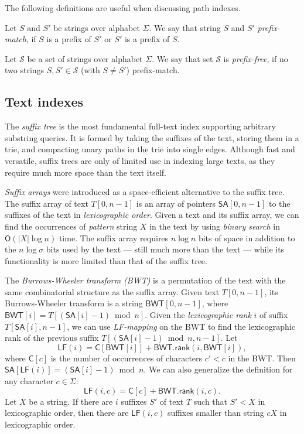 \documentclass[a4paper,UKenglish]{lipics-v2016}
\newcommand{\abs}[1]{\ensuremath{\lvert #1 \rvert}}
\newcommand{\Oh}[1]{\ensuremath{\mathsf{O}\!\left( #1 \right)}}
\newcommand{\rank}{\ensuremath{\mathsf{rank}}}
\newcommand{\LF}{\ensuremath{\mathsf{LF}}}
\newcommand{\LFmapping}{LF\nobreakdash-mapping}
\newcommand{\SA}{\ensuremath{\mathsf{SA}}}
\newcommand{\BWT}{\ensuremath{\mathsf{BWT}}}
\newcommand{\Carray}{\ensuremath{\mathsf{C}}}
\begin{document}
The following definitions are useful when discussing path indexes.

\begin{definition}
Let $S$ and $S'$ be strings over alphabet $\Sigma$. We say that string $S$ and $S'$ \emph{prefix-match}, if $S$ is a prefix of $S'$ or $S'$ is a prefix of $S$.
\end{definition}

\begin{definition}
Let $\mathcal{S}$ be a set of strings over alphabet $\Sigma$. We say that set $\mathcal{S}$ is \emph{prefix-free}, if no two strings $S, S' \in \mathcal{S}$ (with $S \ne S'$) prefix-match.
\end{definition}

\subsection{Text indexes}

The \emph{suffix tree} \cite{Weiner1973} is the most fundamental full-text index supporting arbitrary substring queries. It is formed by taking the suffixes of the text, storing them in a trie, and compacting unary paths in the trie into single edges. Although fast and versatile, suffix trees are only of limited use in indexing large texts, as they require much more space than the text itself.

\emph{Suffix arrays} \cite{Manber1993} were introduced as a space-efficient alternative to the suffix tree. The suffix array of text $T[0, n-1]$ is an array of pointers $\SA[0, n-1]$ to the suffixes of the text in \emph{lexicographic order}. Given a text and its suffix array, we can find the occurrences of \emph{pattern} string $X$ in the text by using \emph{binary search} in $\Oh{\abs{X} \log n}$ time. The suffix array requires $n \log n$ bits of space in addition to the $n \log \sigma$ bits used by the text --- still much more than the text --- while its functionality is more limited than that of the suffix tree.

The \emph{Burrows-Wheeler transform (BWT)} \cite{Burrows1994} is a permutation of the text with the same combinatorial structure as the suffix array. Given text $T[0, n-1]$, its Burrows-Wheeler transform is a string $\BWT[0, n-1]$, where $\BWT[i] = T[(\SA[i]-1) \bmod n]$. Given the \emph{lexicographic rank} $i$ of suffix $T[\SA[i], n-1]$, we can use \emph{\LFmapping} on the BWT to find the lexicographic rank of the previous suffix $T[(\SA[i]-1) \bmod n, n-1]$. Let
$$
\LF(i) = \Carray[\BWT[i]] + \BWT.\rank(i, \BWT[i]),
$$
where $\Carray[c]$ is the number of occurrences of characters $c' < c$ in the BWT. Then $\SA[\LF(i)] = (\SA[i]-1) \bmod n$. We can also generalize the definition for any character $c \in \Sigma$:
$$
\LF(i, c) = \Carray[c] + \BWT.\rank(i, c).
$$
Let $X$ be a string. If there are $i$ suffixes $S'$ of text $T$ such that $S' < X$ in lexicographic order, then there are $\LF(i, c)$ suffixes smaller than string $cX$ in lexicographic order.
\end{document}
